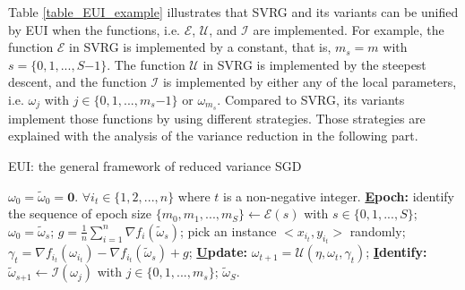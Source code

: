 \documentclass[letterpaper]{article}
\begin{document}
Table \ref{table_EUI_example} illustrates that SVRG and  its variants can be unified by EUI when  the functions, i.e. $\mathcal{E}$, $\mathcal{U}$, and $\mathcal{I}$ are implemented. For example,  the function $\mathcal{E}$ in SVRG is implemented by a constant, that is, $m_s\mathrm{=}m$ with $s\mathrm{=}\{0,1, ..., S\mathrm{-}1\}$. The function $\mathcal{U}$ in SVRG is  implemented by the steepest descent, and the function $\mathcal{I}$ is implemented by either any of the local parameters, i.e. $\omega_j$ with $j\in\{0,1, ..., m_s\mathrm{-}1\}$ or $\omega_{m_s}$.  Compared to  SVRG, its variants implement those functions by using different strategies. Those strategies are explained with the analysis of the variance reduction in the following part. 




\begin{algorithm}[t]
    \caption{EUI: the general framework of  reduced variance SGD}
    \label{algorithm_EUI}
    \begin{algorithmic}[1]
        \Require $\omega_0\mathrm{=}\tilde{\omega}_0\mathrm{=}\mathbf{0}$. $\forall i_t\mathrm{\in}\{1,2, ..., n\}$ where $t$ is a non-negative integer.
        \State \textbf{\uline{E}poch:} identify the sequence of  epoch size $\{m_0, m_1, ..., m_S\}\mathrm{\leftarrow} \mathcal{E}(s)$ with $s\in\{0,1, ..., S\}$;
            \State $\omega_0=\tilde{\omega}_s$;
            \State $g=\frac{1}{n}\sum\limits_{i=1}^n\nabla f_i(\tilde{\omega}_s)$;
                \State pick an instance $\mathrm{<}x_{i_t}, y_{i_t}\mathrm{>}$ randomly;
                \State $\gamma_{t}=\nabla f_{i_t}(\omega_{i_t})-\nabla f_{i_t}(\tilde{\omega}_s)+g$;
                \State \textbf{\uline{U}pdate:} $\omega_{t+1}=\mathcal{U}(\eta, \omega_{t}, \gamma_{t})$;
            \EndFor
            \State \textbf{\uline{I}dentify:} $\tilde{\omega}_{s\mathrm{+}1}\mathrm{\leftarrow}\mathcal{I}(\omega_j)$ with $j\mathrm{\in}\{0,1, ..., m_s\}$;
        \EndFor
        \Return $\tilde{\omega}_S$.
    \end{algorithmic}
\end{algorithm}
\end{document}

